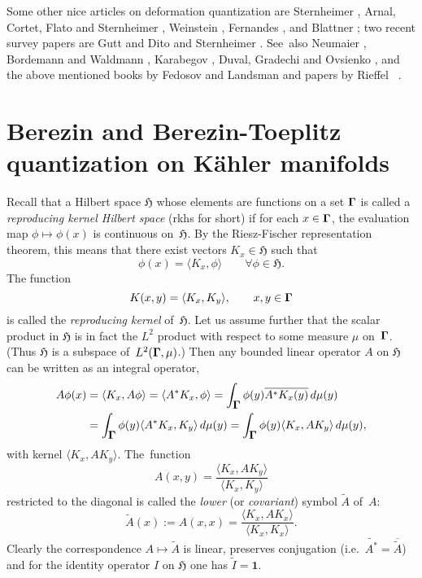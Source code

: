 \documentclass[12pt]{amsart}
\numberwithin{equation}{section}
\theoremstyle{remark}
\let\boldkey\mathbf \let\bold\mathbf
\newcommand\spr[2]{\langle #1,#2\rangle}
\newcommand\into{\int_\Omg}
\newcommand\jedna{{\boldkey1}}
\newcommand\Omg{{\bigam}}   %
\newcommand\HH{\mathfrak H}
\newcommand{\bigam}{\mbox{\boldmath $\Gamma$}}
\begin{document}
Some other nice articles on deformation quantization are Sternheimer
\cite{bib:Stw}, Arnal, Cortet, Flato and Sternheimer \cite{bib:ACFS}, Weinstein
\cite{bib:WeinAst}, Fernandes \cite{bib:Fern}, and Blattner \cite{bib:Blatt};
two recent survey papers are Gutt \cite{bib:GuttV} and Dito and Sternheimer
\cite{bib:DiSt}. See~also Neumaier \cite{bib:Neumai}, Bordemann and Waldmann
\cite{bib:BoWa}, Karabegov \cite{bib:KarC} \cite{bib:KarD}, Duval, Gradechi
and Ovsienko \cite{bib:+DuGrOv}, and the above mentioned books by Fedosov
\cite{bib:FedosBk} and Landsman \cite{bib:LandsBk} and papers by Rieffel
\cite{bib:RiefB}~\cite{bib:Rief}.


\section{Berezin and Berezin-Toeplitz quantization on K\"ahler manifolds}
\label{sec4}
Recall that a Hilbert space $\HH$ whose elements are functions on a set $\Omg$
is called a {\it reproducing kernel Hilbert space\/} (rkhs for short) if for
each $x\in\Omg$, the evaluation map $\phi\mapsto\phi(x)$ is continuous
on~$\HH$. By the Riesz-Fischer representation theorem, this means that there
exist vectors $K_x\in \HH$ such that
$$ \phi(x) = \spr {K_x}\phi \qquad \forall \phi\in \HH.  $$
The function
$$ K(x,y)=\spr{K_x}{K_y}, \qquad x,y\in\Omg $$
is called the {\it reproducing kernel\/} of~$\HH$. Let us assume further that
the scalar product in $\HH$ is in fact the $L^2$ product with respect to some
measure $\mu$ on~$\Omg$. (Thus $\HH$ is a subspace of~$L^2(\Omg,\mu)$.) Then
any bounded linear operator $A$ on $\HH$ can be written as an integral
operator,
\begin{align*}   A\phi(x)
& = \spr{K_x}{A\phi} =\spr{A^*K_x} {\phi}= \into \phi(y) \overline{A^*K_x(y)}
\,d\mu(y) \\
& = \into \phi(y) \spr{A^*K_x}{K_y} \, d\mu(y) =
\into \phi(y) \spr {K_x}{AK_y} \,d\mu(y) ,  \end{align*}
with kernel $\spr {K_x}{AK_y}$. The~function
\begin{equation}  A(x,y) = \frac{\spr {K_x}{AK_y}}{\spr{K_x}{K_y}}
\label{tag:Bses}  \end{equation}
restricted to the diagonal is called the {\it lower\/} (or {\it covariant\/})
symbol $\tilde A$ of~$A$:
\begin{equation}  \tilde A(x) :=A(x,x) =
\frac{\spr{K_x}{AK_x}}{\spr{K_x}{K_x}}. \label{tag:Bsr}  \end{equation}
Clearly the correspondence $A\mapsto\tilde A$ is linear, preserves conjugation
(i.e.~$\widetilde{A^*}=\overline{\tilde A}$) and for the identity operator $I$
on $\HH$ one has $\tilde I=\jedna$.
\end{document}
